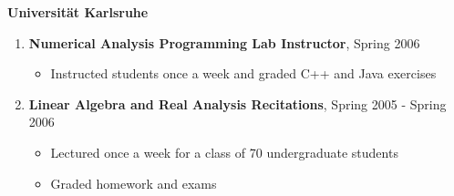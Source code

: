 \documentclass[10pt]{article}
\renewcommand{\section}[2]%
          {\pagebreak[2]\vspace{1.3\baselineskip}%
           \phantomsection\addcontentsline{toc}{section}{#1}%
           \hspace{-.05in}%
  	\marginpar{\raggedright \scshape #1} #2}
\newenvironment{outerlist}[1][\enskip\textbullet]%
          {\begin{enumerate}[#1]}{\end{enumerate}%
           \vspace{-.6\baselineskip}}
\newcommand{\blankline}{\quad\pagebreak[2]}
\begin{document}
  \blankline

  \textbf{Universit\"at Karlsruhe}
  \begin{outerlist}
  \item[] 
  	\textbf{Numerical Analysis Programming Lab Instructor},
  	Spring 2006
  	\begin{itemize}
  		\item Instructed students once a week and graded C++ and Java exercises
  	\end{itemize}
  \item[] 
  	\textbf{Linear Algebra and Real Analysis Recitations}, Spring 2005 - Spring 2006
  	\begin{itemize}
  		\item Lectured once a week for a class of 70 undergraduate students
  		\item Graded homework and exams
  	\end{itemize}
  \end{outerlist}

  \blankline

  \begin{tabular*}{\textwidth}{c}
  \hline
  \end{tabular*}

  		


\end{document}
